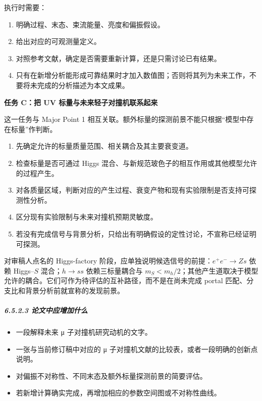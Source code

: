 \documentclass[
]{article}
\providecommand{\tightlist}{%
  \setlength{\itemsep}{0pt}\setlength{\parskip}{0pt}}
\begin{document}
执行时需要：

\begin{enumerate}
\def\labelenumi{\arabic{enumi}.}
\tightlist
\item
  明确过程、末态、束流能量、亮度和偏振假设。
\item
  给出对应的可观测量定义。
\item
  对照参考文献，确定是否需要重新计算，还是只需讨论已有结果。
\item
  只有在新增分析能形成可靠结果时才加入数值图；否则将其列为未来工作，不要将未完成的分析描述为本文成果。
\end{enumerate}

\textbf{任务 C：把 UV 标量与未来轻子对撞机联系起来}

这一任务与 Major Point 1
相互关联。额外标量的探测前景不能只根据``模型中存在标量''作判断。

\begin{enumerate}
\def\labelenumi{\arabic{enumi}.}
\tightlist
\item
  先确定允许的标量质量范围、相关耦合及其主要衰变道。
\item
  检查标量是否可通过 Higgs
  混合、与新规范玻色子的相互作用或其他模型允许的过程产生。
\item
  对各质量区域，判断对应的产生过程、衰变产物和现有实验限制是否支持可探测性分析。
\item
  区分现有实验限制与未来对撞机预期灵敏度。
\item
  若没有完成信号与背景分析，只给出有明确假设的定性讨论，不宣称已经证明可探测。
\end{enumerate}

对审稿人点名的 Higgs-factory
阶段，应单独说明候选信号的前提：\(e^+e^-\to Zs\) 依赖 Higgs--\(S\)
混合；\(h\to ss\) 依赖三标量耦合与
\(m_S<m_h/2\)；其他产生道取决于模型允许的耦合。它们可作为待评估的互补路径，而不是在尚未完成
portal 匹配、分支比和背景分析前就宣称的发现前景。

\subparagraph{6.5.2.3
论文中应增加什么}\label{ux8bbaux6587ux4e2dux5e94ux589eux52a0ux4ec0ux4e48-3}

\begin{itemize}
\tightlist
\item
  一段解释未来 μ 子对撞机研究动机的文字。
\item
  一张与当前修订稿中对应的 μ
  子对撞机文献的比较表，或者一段明确的创新点说明。
\item
  对偏振不对称性、不同末态及额外标量探测前景的简要评估。
\item
  若新增计算确实完成，再增加相应的参数空间图或不对称性曲线。
\end{itemize}
\end{document}
